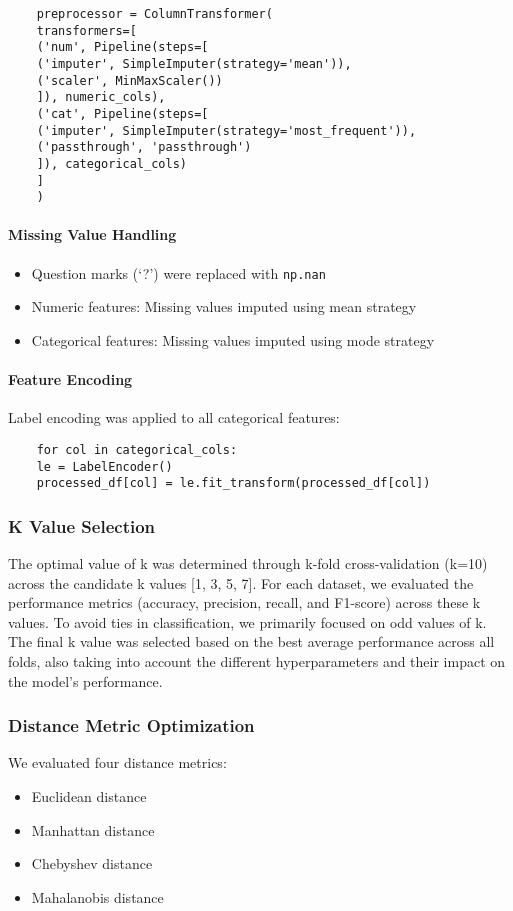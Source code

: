 \begin{verbatim}
    preprocessor = ColumnTransformer(
    transformers=[
    ('num', Pipeline(steps=[
    ('imputer', SimpleImputer(strategy='mean')),
    ('scaler', MinMaxScaler())
    ]), numeric_cols),
    ('cat', Pipeline(steps=[
    ('imputer', SimpleImputer(strategy='most_frequent')),
    ('passthrough', 'passthrough')
    ]), categorical_cols)
    ]
    )
\end{verbatim}

\paragraph{Missing Value Handling}
    \begin{itemize}
    \item Question marks (`?') were replaced with \texttt{np.nan}
    \item Numeric features: Missing values imputed using mean strategy
    \item Categorical features: Missing values imputed using mode strategy
    \end{itemize}

\paragraph{Feature Encoding}
Label encoding was applied to all categorical features:
\begin{verbatim}
    for col in categorical_cols:
    le = LabelEncoder()
    processed_df[col] = le.fit_transform(processed_df[col])
\end{verbatim}

\subsubsection*{K Value Selection}
The optimal value of k was determined through k-fold cross-validation (k=10) across the candidate k values [1, 3, 5, 7].
For each dataset, we evaluated the performance metrics (accuracy, precision, recall, and F1-score) across these k values.
To avoid ties in classification, we primarily focused on odd values of k.
The final k value was selected based on the best average performance across all folds, also taking into account
the different hyperparameters and their impact on the model's performance.

\subsubsection*{Distance Metric Optimization}
We evaluated four distance metrics:
\begin{itemize}
\item Euclidean distance
\item Manhattan distance
\item Chebyshev distance
\item Mahalanobis distance
\end{itemize}


